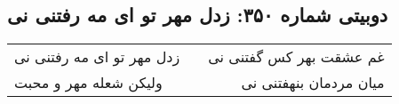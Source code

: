 \begin{center}
\section*{دوبیتی شماره ۳۵۰: زدل مهر تو ای مه رفتنی نی}
\label{sec:350}
\begin{longtable}{l p{0.5cm} r}
زدل مهر تو ای مه رفتنی نی
&&
غم عشقت بهر کس گفتنی نی
\\
ولیکن شعله مهر و محبت
&&
میان مردمان بنهفتنی نی
\\
\end{longtable}
\end{center}
